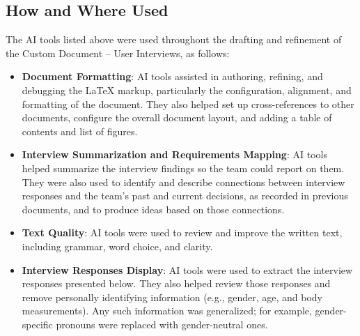 \documentclass[12pt]{article}
\begin{document}
\subsection{How and Where Used}
The AI tools listed above were used throughout the drafting and refinement of
the Custom Document -- User Interviews, as follows:
\begin{itemize}
  \item \textbf{Document Formatting}: AI tools assisted in authoring, refining,
    and debugging the LaTeX markup, particularly the configuration, alignment,
    and formatting of the document. They also helped set up cross-references to
    other documents, configure the overall document layout, and adding a table of contents
    and list of figures.
  \item \textbf{Interview Summarization and Requirements Mapping}: AI tools
    helped summarize the interview findings so the team could report on them.
    They were also used to identify and describe connections between interview responses and
    the team's past and current decisions, as recorded in previous documents,
    and to produce ideas based on those connections.
  \item \textbf{Text Quality}: AI tools were used to review and improve the
    written text, including grammar, word choice, and clarity.
  \item \textbf{Interview Responses Display}: AI tools were used to extract the interview
    responses presented below. They also helped review those responses and
    remove personally identifying information (e.g., gender, age, and body
    measurements). Any such information was generalized; for example,
    gender-specific pronouns were replaced with gender-neutral ones.
\end{itemize}
\end{document}

